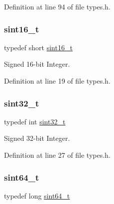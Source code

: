 Definition at line 94 of file types.\+h.

\mbox{\label{a00125_a5881659ed80e940350d12831204375cd_a5881659ed80e940350d12831204375cd}} 
\subsubsection{\texorpdfstring{sint16\+\_\+t}{sint16\_t}}
{\footnotesize\ttfamily typedef short \hyperlink{a00125_a5881659ed80e940350d12831204375cd_a5881659ed80e940350d12831204375cd}{sint16\+\_\+t}}



Signed 16-\/bit Integer. 



Definition at line 19 of file types.\+h.

\mbox{\label{a00125_ad838970452fe561cb8e0550cac5336be_ad838970452fe561cb8e0550cac5336be}} 
\subsubsection{\texorpdfstring{sint32\+\_\+t}{sint32\_t}}
{\footnotesize\ttfamily typedef int \hyperlink{a00125_ad838970452fe561cb8e0550cac5336be_ad838970452fe561cb8e0550cac5336be}{sint32\+\_\+t}}



Signed 32-\/bit Integer. 



Definition at line 27 of file types.\+h.

\mbox{\label{a00125_a04761b9e7480e1e48b0d392da17fd5d4_a04761b9e7480e1e48b0d392da17fd5d4}} 
\subsubsection{\texorpdfstring{sint64\+\_\+t}{sint64\_t}}
{\footnotesize\ttfamily typedef long \hyperlink{a00125_a04761b9e7480e1e48b0d392da17fd5d4_a04761b9e7480e1e48b0d392da17fd5d4}{sint64\+\_\+t}}



